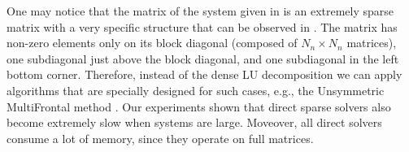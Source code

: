 One may notice that the matrix of the system given in  is an extremely sparse matrix with a very specific structure that can be observed in . The matrix has non-zero elements only on its block diagonal (composed of $N_n \times N_n$ matrices), one subdiagonal just above the block diagonal, and one subdiagonal in the left bottom corner. Therefore, instead of the dense LU decomposition we can apply algorithms that are specially designed for such cases, e.g., the Unsymmetric MultiFrontal method \cite{umfpack2004}. Our experiments shown that direct sparse solvers also become extremely slow when systems are large. Moveover, all direct solvers consume a lot of memory, since they operate on full matrices.
